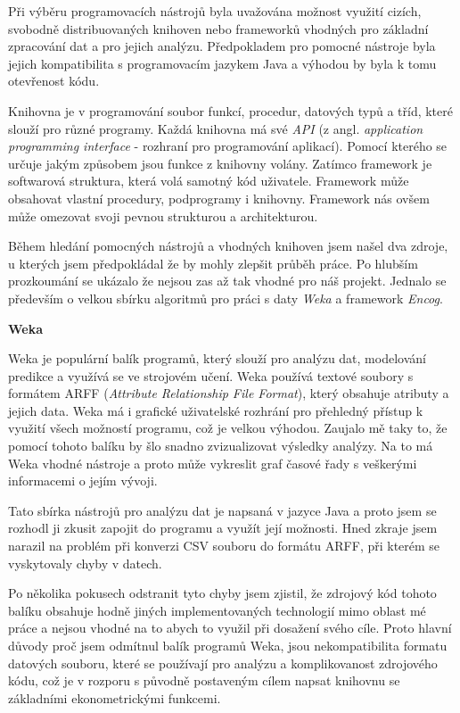 \documentclass[a4paper,12pt,twoside]{scrreprt}
\begin{document}
Při výběru programovacích nástrojů byla uvažována možnost využití cizích, svobodně distribuovaných knihoven nebo frameworků vhodných pro základní zpracování dat a pro jejich analýzu. Předpokladem pro pomocné nástroje byla jejich kompatibilita s programovacím jazykem Java a výhodou by byla k tomu otevřenost kódu. 

Knihovna je v programování soubor funkcí, procedur, datových typů a tříd, které slouží pro různé programy. Každá knihovna má své \textit{API} (z angl. \textit{application programming interface} - rozhraní pro programování aplikací). Pomocí kterého se určuje jakým způsobem jsou funkce z knihovny volány. Zatímco framework je softwarová struktura, která volá samotný kód uživatele. Framework může obsahovat vlastní procedury, podprogramy i knihovny. Framework nás ovšem může omezovat svoji pevnou strukturou a architekturou. 

Během hledání pomocných nástrojů a vhodných knihoven jsem našel dva zdroje, u kterých jsem předpokládal že by mohly zlepšit průběh práce. Po hlubším \\ prozkoumání se ukázalo že nejsou zas až tak vhodné pro náš projekt. Jednalo se především o velkou sbírku algoritmů pro práci s daty \textit{Weka} a framework \textit{Encog}.  
\vspace*{0.5cm}

\textbf{Weka}

Weka je populární balík programů, který slouží pro analýzu dat, modelování predikce a využívá se ve strojovém učení. Weka používá textové soubory s formátem ARFF (\textit{Attribute Relationship File Format}), který obsahuje atributy a jejich data. Weka má i grafické uživatelské rozhrání pro přehledný přístup k využití všech možností programu, což je velkou výhodou. Zaujalo mě taky to, že pomocí tohoto balíku by šlo snadno zvizualizovat výsledky analýzy. Na to má Weka vhodné nástroje a  proto může vykreslit graf časové řady s veškerými informacemi o jejím vývoji.

Tato sbírka nástrojů pro analýzu dat je napsaná v jazyce Java a proto jsem se rozhodl ji zkusit zapojit do programu a využít její možnosti. Hned zkraje jsem narazil na problém při konverzi CSV souboru do formátu ARFF, při kterém se vyskytovaly chyby v datech.

Po několika pokusech odstranit tyto chyby jsem zjistil, že zdrojový kód tohoto balíku obsahuje hodně jiných implementovaných technologií mimo oblast mé práce a nejsou vhodné na to abych to využil při dosažení svého cíle. Proto hlavní důvody proč jsem odmítnul balík programů Weka, jsou nekompatibilita formatu datových souboru, které se používají pro analýzu a komplikovanost zdrojového kódu, což je v rozporu s původně postaveným cílem napsat knihovnu se základními ekonometrickými funkcemi.            
\end{document}
